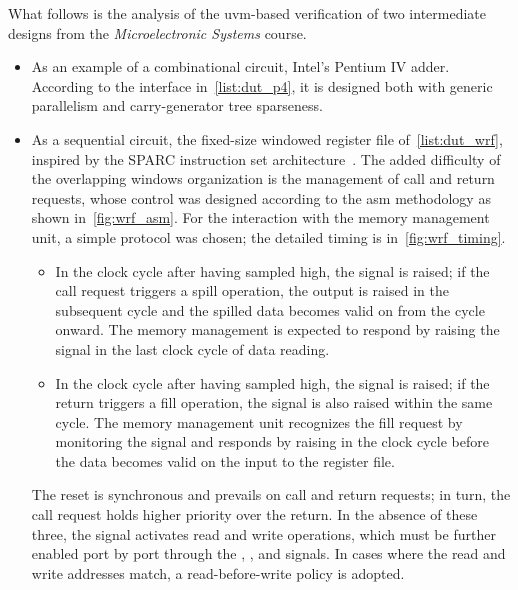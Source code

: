 \noindent What follows is the analysis of the \ac{uvm}-based verification of two intermediate designs from the \emph{Microelectronic Systems} course.
\begin{itemize}
    \item As an example of a combinational circuit, Intel's Pentium IV adder. According to the interface in~\cref{list:dut_p4}, it is designed both with generic parallelism and carry-generator tree sparseness.
    
    \item As a sequential circuit, the fixed-size windowed register file of~\cref{list:dut_wrf}, inspired by the SPARC instruction set architecture~\cite{SPARC:manv8}. The added difficulty of the overlapping windows organization is the management of call and return requests, whose control was designed according to the \ac{asm} methodology as shown in~\cref{fig:wrf_asm}. For the interaction with the memory management unit, a simple protocol was chosen; the detailed timing is in~\cref{fig:wrf_timing}.
    \begin{itemize}
        \item In the clock cycle after having sampled  high, the  signal is raised; if the call request triggers a spill operation, the  output is raised in the subsequent cycle and the spilled data becomes valid on  from the cycle onward. The memory management is expected to respond by raising the  signal in the last clock cycle of data reading. 
        
        \item In the clock cycle after having sampled  high, the  signal is raised; if the return triggers a fill operation, the  signal is also raised within the same cycle. The memory management unit recognizes the fill request by monitoring the  signal and responds by raising  in the clock cycle before the data becomes valid on the  input to the register file.
    \end{itemize}
    The reset is synchronous and prevails on call and return requests; in turn, the call request holds higher priority over the return. In the absence of these three, the  signal activates read and write operations, which must be further enabled port by port through the , , and  signals. In cases where the read and write addresses match, a read-before-write policy is adopted.
\end{itemize}